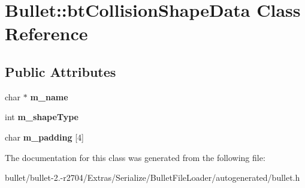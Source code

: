 \hypertarget{class_bullet_1_1bt_collision_shape_data}{\section{Bullet\+:\+:bt\+Collision\+Shape\+Data Class Reference}
\label{class_bullet_1_1bt_collision_shape_data}
}
\subsection*{Public Attributes}
\begin{DoxyCompactItemize}
\item 
\hypertarget{class_bullet_1_1bt_collision_shape_data_ad0c17a18fd3d87c226e6db22f87ff358}{char $\ast$ {\bfseries m\+\_\+name}}\label{class_bullet_1_1bt_collision_shape_data_ad0c17a18fd3d87c226e6db22f87ff358}

\item 
\hypertarget{class_bullet_1_1bt_collision_shape_data_af1840be1898c0b0a8f7bd0ca5c70be64}{int {\bfseries m\+\_\+shape\+Type}}\label{class_bullet_1_1bt_collision_shape_data_af1840be1898c0b0a8f7bd0ca5c70be64}

\item 
\hypertarget{class_bullet_1_1bt_collision_shape_data_ae0ad8aec14eb9964d31cb171212ec7c2}{char {\bfseries m\+\_\+padding} \mbox{[}4\mbox{]}}\label{class_bullet_1_1bt_collision_shape_data_ae0ad8aec14eb9964d31cb171212ec7c2}

\end{DoxyCompactItemize}


The documentation for this class was generated from the following file\+:\begin{DoxyCompactItemize}
\item 
bullet/bullet-\/2.-\/r2704/\+Extras/\+Serialize/\+Bullet\+File\+Loader/autogenerated/bullet.\+h\end{DoxyCompactItemize}
